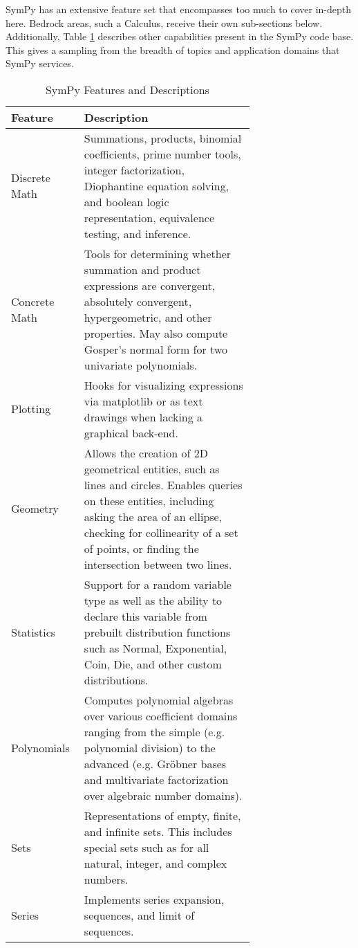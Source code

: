 
SymPy has an extensive feature set that encompasses too much to cover
in-depth here. Bedrock areas, such a Calculus, receive their own sub-sections
below. Additionally, Table \ref{features-table} describes other capabilities
present in the SymPy code base. This gives a sampling from the breadth of
topics and application domains that SymPy services.


\begin{longtable}[htbc]{|l|p{0.7\linewidth}|}
\caption{SymPy Features and Descriptions\label{features-table}}\\
\hline
\textbf{Feature} & \textbf{Description} \\
\hline
Discrete Math & Summations, products, binomial coefficients,
    prime number tools, integer factorization, Diophantine equation solving, and
    boolean logic representation, equivalence testing, and inference.\\
Concrete Math & Tools for determining whether summation and product
    expressions are convergent, absolutely convergent, hypergeometric, and
    other properties. May also compute Gosper's normal form
    \cite{petkovvsek1996bak} for two univariate polynomials.\\
Plotting & Hooks for visualizing expressions via matplotlib \cite{Hunter:2007}
    or as text drawings when lacking a graphical back-end.\\
Geometry & Allows the creation of 2D geometrical entities,
    such as lines and circles. Enables queries on these entities, including
    asking the area of an ellipse, checking for collinearity of a set of
    points, or finding the intersection between two lines.\\
Statistics & Support for a random variable type as well as the ability to
    declare this variable from prebuilt distribution functions such as
    Normal, Exponential, Coin, Die, and other custom distributions.\\
Polynomials & Computes polynomial algebras over various coefficient domains
    ranging from the simple (e.g. polynomial division) to the advanced
    (e.g. Gr\"obner bases \cite{adams1994introduction} and multivariate
    factorization over algebraic number domains).\\
Sets & Representations of empty, finite, and infinite sets. This includes
    special sets such as for all natural, integer, and complex numbers.\\
Series & Implements series expansion, sequences, and limit of sequences.

\end{longtable}
